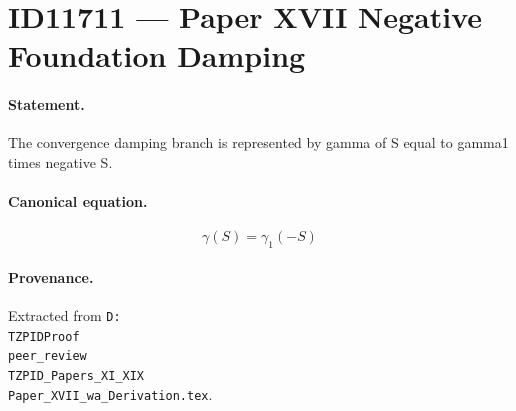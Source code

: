\section*{ID11711 --- Paper XVII Negative Foundation Damping}

\paragraph{Statement.}
The convergence damping branch is represented by gamma of S equal to gamma1 times negative S.

\paragraph{Canonical equation.}
\[
\gamma(S)=\gamma_1(-S)
\]

\paragraph{Provenance.}
Extracted from \texttt{D:\\TZPIDProof\\peer\_review\\TZPID\_Papers\_XI\_XIX\\Paper\_XVII\_wa\_Derivation.tex}.
